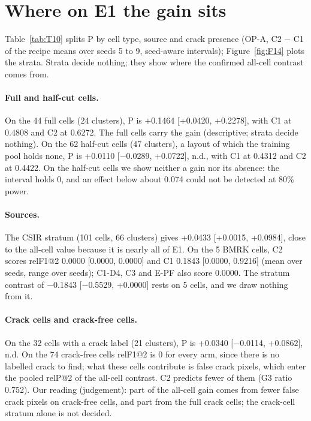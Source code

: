 \section{Where on E1 the gain sits}\label{sec:e1-strata}

Table~\ref{tab:T10} splits P by cell type, source and crack presence (OP-A, C2 $-$ C1 of the recipe means over seeds 5 to 9,
seed-aware intervals); Figure~\ref{fig:F14} plots the strata. Strata decide nothing; they show where the confirmed all-cell contrast
comes from.


\paragraph{Full and half-cut cells.} On the 44 full cells (24 clusters), P is +0.1464 [+0.0420, +0.2278], with C1 at 0.4808 and
C2 at 0.6272. The full cells carry the gain (descriptive; strata decide nothing). On the 62 half-cut cells (47 clusters), a layout of which the training pool holds none, P is +0.0110
[$-$0.0289, +0.0722], n.d., with C1 at 0.4312 and C2 at 0.4422. On the half-cut cells we show
neither a gain nor its absence: the interval holds 0, and an effect below about 0.074 could not be detected at 80\% power.

\paragraph{Sources.} The CSIR stratum (101 cells, 66 clusters) gives +0.0433 [+0.0015, +0.0984], close to the all-cell value
because it is nearly all of E1. On the 5 BMRK cells, C2 scores relF1@2 0.0000 [0.0000, 0.0000] and C1 0.1843 [0.0000, 0.9216]
(mean over seeds, range over seeds); C1-D4, C3 and E-PF also score 0.0000. The stratum contrast of $-$0.1843
[$-$0.5529, +0.0000] rests on 5 cells, and we draw nothing from it.

\paragraph{Crack cells and crack-free cells.} On the 32 cells with a crack label (21 clusters), P is +0.0340
[$-$0.0114, +0.0862], n.d. On the 74 crack-free cells relF1@2 is 0 for every arm, since there is no labelled crack to find; what
these cells contribute is false crack pixels, which enter the pooled relP@2 of the all-cell contrast. C2 predicts fewer of
them (G3 ratio 0.752). Our reading (judgement): part of the all-cell gain comes from fewer false crack pixels on crack-free
cells, and part from the full crack cells; the crack-cell stratum alone is not decided.

